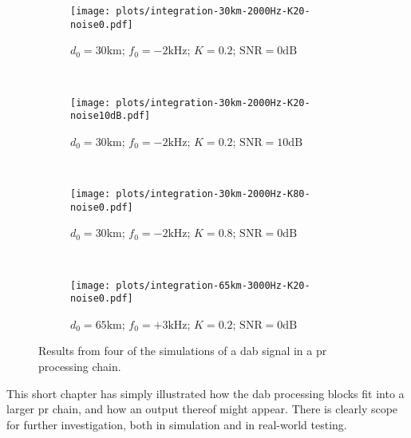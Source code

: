 \documentclass[class=report,11pt,crop=false]{standalone}
\begin{document}
\begin{figure}[htbp]
    \centering
    \captionsetup{type=figure}
    \begin{subfigure}[t]{0.49\textwidth}
        \centering
        \captionsetup{type=figure}
        \texttt{[image: plots/integration-30km-2000Hz-K20-noise0.pdf]}
        \caption{\(d_0 = 30\si{\kilo\metre}\); \(f_0 = -2\si{\kilo\hertz}\); \(K = 0.2\); \(\textrm{SNR} = 0\si{\deci\bel}\)}
        \label{fig:integration-simulation-1}
    \end{subfigure}%
    ~
    \begin{subfigure}[t]{0.49\textwidth}
        \centering
        \captionsetup{type=figure}
        \texttt{[image: plots/integration-30km-2000Hz-K20-noise10dB.pdf]}
        \caption{\(d_0 = 30\si{\kilo\metre}\); \(f_0 = -2\si{\kilo\hertz}\); \(K = 0.2\); \(\textrm{SNR} = 10\si{\deci\bel}\)}
        \label{fig:integration-simulation-2}
    \end{subfigure}%
    \\
    \begin{subfigure}[t]{0.49\textwidth}
        \centering
        \captionsetup{type=figure}
        \texttt{[image: plots/integration-30km-2000Hz-K80-noise0.pdf]}
        \caption{\(d_0 = 30\si{\kilo\metre}\); \(f_0 = -2\si{\kilo\hertz}\); \(K = 0.8\); \(\textrm{SNR} = 0\si{\deci\bel}\)}
        \label{fig:integration-simulation-3}
    \end{subfigure}%
    ~
    \begin{subfigure}[t]{0.49\textwidth}
        \centering
        \captionsetup{type=figure}
        \texttt{[image: plots/integration-65km-3000Hz-K20-noise0.pdf]}
        \caption{\(d_0 = 65\si{\kilo\metre}\); \(f_0 = +3\si{\kilo\hertz}\); \(K = 0.2\); \(\textrm{SNR} = 0\si{\deci\bel}\)}
        \label{fig:integration-simulation-4}
    \end{subfigure}%
    \caption{Results from four of the simulations of a \gls{dab} signal in a \gls{pr} processing chain.}
    \label{fig:integration-simulation-all}
\end{figure}

This short chapter has simply illustrated how the \gls{dab} processing blocks fit into a larger \gls{pr} chain, and how an output thereof might appear. There is clearly scope for further investigation, both in simulation and in real-world testing.

\ifstandalone

\printnoidxglossary[type=\acronymtype,nonumberlist]
\fi
\end{document}
